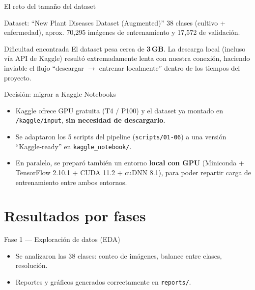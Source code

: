 \documentclass[aspectratio=169]{beamer}
\begin{document}
\begin{frame}{El reto del tamaño del dataset}
  \begin{block}{Dataset: ``New Plant Diseases Dataset (Augmented)''}
    38 clases (cultivo + enfermedad), aprox. 70{,}295 imágenes de entrenamiento y 17{,}572 de validación.
  \end{block}
  \vspace{0.3cm}
  \begin{alertblock}{Dificultad encontrada}
    El dataset pesa cerca de \textbf{3\,GB}. La descarga local (incluso vía API de Kaggle) resultó extremadamente lenta con nuestra conexión, haciendo inviable el flujo ``descargar $\rightarrow$ entrenar localmente'' dentro de los tiempos del proyecto.
  \end{alertblock}
\end{frame}

\begin{frame}{Decisión: migrar a Kaggle Notebooks}
  \begin{itemize}
    \item Kaggle ofrece GPU gratuita (T4 / P100) y el dataset ya montado en \texttt{/kaggle/input}, \textbf{sin necesidad de descargarlo}.
    \item Se adaptaron los 5 scripts del pipeline (\texttt{scripts/01-06}) a una versión ``Kaggle-ready'' en \texttt{kaggle\_notebook/}.
    \item En paralelo, se preparó también un entorno \textbf{local con GPU} (Miniconda + TensorFlow 2.10.1 + CUDA 11.2 + cuDNN 8.1), para poder repartir carga de entrenamiento entre ambos entornos.
  \end{itemize}
\end{frame}

\section{Resultados por fases}

\begin{frame}{Fase 1 — Exploración de datos (EDA)}
  \begin{itemize}
    \item Se analizaron las 38 clases: conteo de imágenes, balance entre clases, resolución.
    \item Reportes y gráficos generados correctamente en \texttt{reports/}.
  \end{itemize}
\end{frame}
\end{document}
